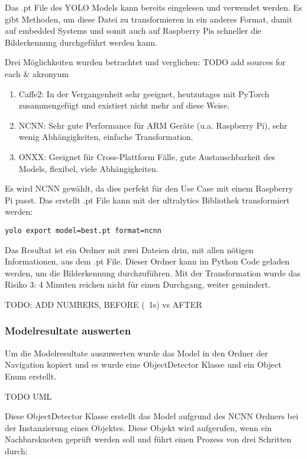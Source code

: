 Das .pt File des YOLO Models kann bereits eingelesen und verwendet werden. Es gibt Methoden, um diese Datei zu transformieren in ein anderes Format, damit auf embedded Systems und somit auch auf Raspberry Pis schneller die Bilderkennung durchgeführt werden kann.

Drei Möglichkeiten wurden betrachtet und verglichen:
TODO add sources for each \& akronyum
\begin{enumerate}
    \item Caffe2: In der Vergangenheit sehr geeignet, heutzutages mit PyTorch zusammengefügt und existiert nicht mehr auf diese Weise.
    \item NCNN: Sehr gute Performance für ARM Geräte (u.a. Raspberry Pi), sehr wenig Abhängigkeiten, einfache Transformation.
    \item ONXX: Geeignet für  Cross-Plattform Fälle, gute Austauschbarkeit des Models, flexibel, viele Abhängigkeiten.
\end{enumerate}

Es wird NCNN gewählt, da dies perfekt für den Use Case mit einem Raspberry Pi passt. Das erstellt .pt File kann mit der ultralytics Bibliothek transformiert werden:

\begin{verbatim}
yolo export model=best.pt format=ncnn
\end{verbatim}

Das Resultat ist ein Ordner mit zwei Dateien drin, mit allen nötigen Informationen, aus dem .pt File. Dieser Ordner kann im Python Code geladen werden, um die Bilderkennung durchzuführen. Mit der Transformation wurde das Risiko 3: 4 Minuten reichen nicht für einen Durchgang, weiter gemindert.

TODO: ADD NUMBERS, BEFORE (~1s) vs AFTER

\subsubsection{Modelresultate auswerten}
\label{model-results}

Um die Modelresultate auszuwerten wurde das Model in den Ordner der Navigation kopiert und es wurde eine ObjectDetector Klasse und ein Object Enum erstellt.

TODO UML

Diese ObjectDetector Klasse erstellt das Model aufgrund des NCNN Ordners bei der Instanzierung eines Objektes. Diese Objekt wird aufgerufen, wenn ein Nachbarsknoten geprüft werden soll und führt einen Prozess von drei Schritten durch:

